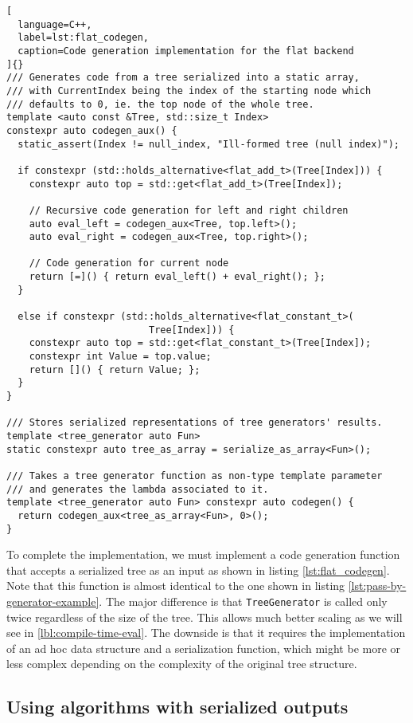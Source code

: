 \documentclass[../main]{subfiles}
\begin{document}
\begin{lstlisting}[
  language=C++,
  label=lst:flat_codegen,
  caption=Code generation implementation for the flat backend
]{}
/// Generates code from a tree serialized into a static array,
/// with CurrentIndex being the index of the starting node which
/// defaults to 0, ie. the top node of the whole tree.
template <auto const &Tree, std::size_t Index>
constexpr auto codegen_aux() {
  static_assert(Index != null_index, "Ill-formed tree (null index)");

  if constexpr (std::holds_alternative<flat_add_t>(Tree[Index])) {
    constexpr auto top = std::get<flat_add_t>(Tree[Index]);

    // Recursive code generation for left and right children
    auto eval_left = codegen_aux<Tree, top.left>();
    auto eval_right = codegen_aux<Tree, top.right>();

    // Code generation for current node
    return [=]() { return eval_left() + eval_right(); };
  }

  else if constexpr (std::holds_alternative<flat_constant_t>(
                         Tree[Index])) {
    constexpr auto top = std::get<flat_constant_t>(Tree[Index]);
    constexpr int Value = top.value;
    return []() { return Value; };
  }
}

/// Stores serialized representations of tree generators' results.
template <tree_generator auto Fun>
static constexpr auto tree_as_array = serialize_as_array<Fun>();

/// Takes a tree generator function as non-type template parameter
/// and generates the lambda associated to it.
template <tree_generator auto Fun> constexpr auto codegen() {
  return codegen_aux<tree_as_array<Fun>, 0>();
}
\end{lstlisting}

To complete the implementation, we must implement a code generation function
that accepts a serialized tree as an input as shown in listing
\ref{lst:flat_codegen}. Note that this function is almost identical to
the one shown in listing \ref{lst:pass-by-generator-example}.
The major difference is that \lstinline{TreeGenerator} is called only
twice regardless of the size of the tree. This allows much better scaling
as we will see in \ref{lbl:compile-time-eval}.
The downside is that it requires the implementation of an ad hoc data
structure and a serialization function, which might be more or less complex
depending on the complexity of the original tree structure.

\subsection{
  Using algorithms with serialized outputs
}
\label{lbl:codegen-from-rpn}
\end{document}
